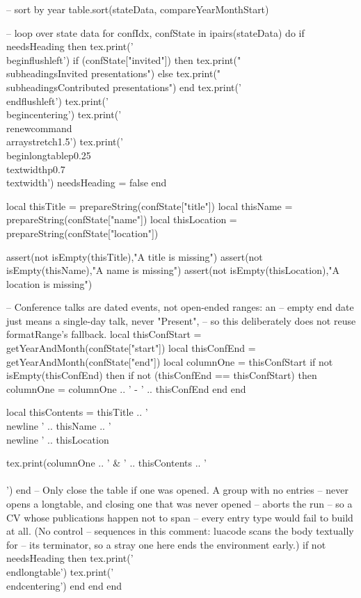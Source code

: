 \documentclass[letterpaper, 10pt]{article}
\newcommand{\subheadings}[1]{\textbf{#1} \vspace{5pt}}
\begin{document}
\begin{luacode}
			-- sort by year
			table.sort(stateData, compareYearMonthStart)

			-- loop over state data
			for confIdx, confState in ipairs(stateData) do
				if needsHeading then
					tex.print('\\begin{flushleft}')
					if (confState["invited"]) then
						tex.print("\\subheadings{Invited presentations}")
					else
						tex.print("\\subheadings{{Contributed presentations}}")
					end
					tex.print('\\end{flushleft}')
					tex.print('\\begin{centering}')
					tex.print('\\renewcommand{\\arraystretch}{1.5}')
					tex.print('\\begin{longtable}{p{0.25\\textwidth}p{0.7\\textwidth}}')
					needsHeading = false
				end

				local thisTitle     = prepareString(confState["title"])
				local thisName      = prepareString(confState["name"])
				local thisLocation  = prepareString(confState["location"])

				assert(not isEmpty(thisTitle),"A title is missing")
				assert(not isEmpty(thisName),"A name is missing")
				assert(not isEmpty(thisLocation),"A location is missing")

				-- Conference talks are dated events, not open-ended ranges: an
				-- empty end date just means a single-day talk, never "Present",
				-- so this deliberately does not reuse formatRange's fallback.
				local thisConfStart = getYearAndMonth(confState["start"])
				local thisConfEnd = getYearAndMonth(confState["end"])
				local columnOne = thisConfStart
				if not isEmpty(thisConfEnd) then
					if not (thisConfEnd == thisConfStart) then
						columnOne = columnOne .. ' - ' .. thisConfEnd
					end
				end

				local thisContents = thisTitle ..
									'\\newline ' .. thisName ..
									'\\newline ' .. thisLocation

				tex.print(columnOne .. ' & ' .. thisContents .. ' \\\\')
			end
			-- Only close the table if one was opened. A group with no entries
			-- never opens a longtable, and closing one that was never opened
			-- aborts the run -- so a CV whose publications happen not to span
			-- every entry type would fail to build at all. (No control
			-- sequences in this comment: luacode scans the body textually for
			-- its terminator, so a stray one here ends the environment early.)
			if not needsHeading then
				tex.print('\\end{longtable}')
				tex.print('\\end{centering}')
			end
		end
	end


\end{luacode}
\end{document}
